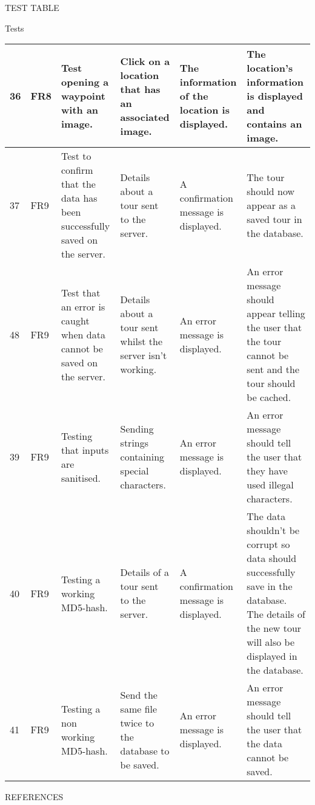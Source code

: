 \documentclass{article}
\begin{document}
\begin{section}{TEST TABLE}
\begin{subsection}{Tests}
\begin{tabularx}{\linewidth}{| p{0.7cm} | p{0.8cm} | p{3cm} | p{3.5cm} | X | X |}
36
&
FR8
&
Test opening a waypoint with an image.
&
Click on a location that has an associated image.
&
The information of the location is displayed.
&
The location's information is displayed and contains an image.
\\
\hline


37
&
FR9
&
Test to confirm that the data has been successfully saved on the server.
&
Details about a tour sent to the server.
&
A confirmation message is displayed. 
&
The tour should now appear as a saved tour in the database.
\\
\hline

48
&
FR9
&
Test that an error is caught when data cannot be saved  on the server.
&
Details about a tour sent whilst the server isn't working.
&
An error message is displayed.
&
An error message should appear telling the user that the tour cannot be sent and the tour should be cached.
\\
\hline

39
&
FR9
&
Testing that inputs are sanitised.
&
Sending strings containing special characters.
&
An error message is displayed.
&
An error message should tell the user that they have used illegal characters.
\\
\hline

40
&
FR9
&
Testing a working MD5-hash.
&
Details of a tour sent to the server.
&
A confirmation message is displayed.
&
The data shouldn't be corrupt so data should successfully save in the database. The details of the new tour will also be displayed in the database.
\\
\hline

41
&
FR9
&
Testing a non working MD5-hash.
&
Send the same file twice to the database to be saved.
&
An error message is displayed.
&
An error message should tell the user that the data cannot be saved.
\\
\hline

			\end{tabularx}
		\end{subsection}
	\end{section}
	
	\nocite{LaTeXTemplate}

	\newpage
	\begin{section}{REFERENCES}
		
		
	\end{section}
	
\end{document}
